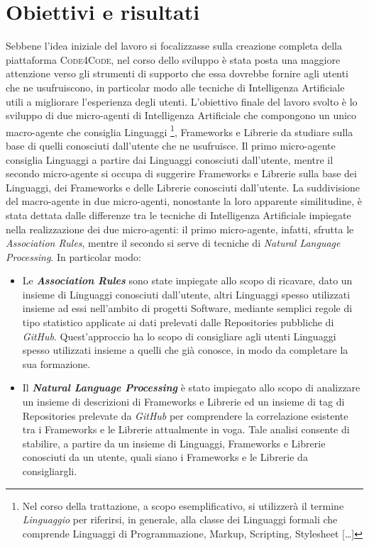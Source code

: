 \section{Obiettivi e risultati}
Sebbene l'idea iniziale del lavoro si focalizzasse sulla creazione completa della piattaforma \textsc{Code4Code}, nel corso dello sviluppo è stata posta una maggiore attenzione verso gli strumenti di supporto che essa dovrebbe fornire agli utenti che ne usufruiscono, in particolar modo alle tecniche di Intelligenza Artificiale utili a migliorare l'esperienza degli utenti. L'obiettivo finale del lavoro svolto è lo sviluppo di due micro-agenti di Intelligenza Artificiale che compongono un unico macro-agente che consiglia Linguaggi \footnote{Nel corso della trattazione, a scopo esemplificativo, si utilizzerà il termine \emph{Linguaggio} per riferirsi, in generale, alla classe dei Linguaggi formali che comprende Linguaggi di Programmazione, Markup, Scripting, Stylesheet [\dots]}, Frameworks e Librerie da studiare sulla base di quelli conosciuti dall'utente che ne usufruisce. Il primo micro-agente consiglia Linguaggi a partire dai Linguaggi conosciuti dall'utente, mentre il secondo micro-agente si occupa di suggerire Frameworks e Librerie sulla base dei Linguaggi, dei Frameworks e delle Librerie conosciuti dall'utente. La suddivisione del macro-agente in due micro-agenti, nonostante la loro apparente similitudine, è stata dettata dalle differenze tra le tecniche di Intelligenza Artificiale impiegate nella realizzazione dei due micro-agenti: il primo micro-agente, infatti, sfrutta le \emph{Association Rules}, mentre il secondo si serve di tecniche di \emph{Natural Language Processing}. In particolar modo:
\begin{itemize}
    \item Le \emph\textbf{Association Rules} sono state impiegate allo scopo di ricavare, dato un insieme di Linguaggi conosciuti dall'utente, altri Linguaggi spesso utilizzati insieme ad essi nell'ambito di progetti Software, mediante semplici regole di tipo statistico applicate ai dati prelevati dalle Repositories pubbliche di \emph{GitHub}. Quest'approccio ha lo scopo di consigliare agli utenti Linguaggi spesso utilizzati insieme a quelli che già conosce, in modo da completare la sua formazione.
    \item Il \emph\textbf{Natural Language Processing} è stato impiegato allo scopo di analizzare un insieme di descrizioni di Frameworks e Librerie ed un insieme di tag di Repositories prelevate da \emph{GitHub} per comprendere la correlazione esistente tra i Frameworks e le Librerie attualmente in voga. Tale analisi consente di stabilire, a partire da un insieme di Linguaggi, Frameworks e Librerie conosciuti da un utente, quali siano i Frameworks e le Librerie da consigliargli. 
\end{itemize}
